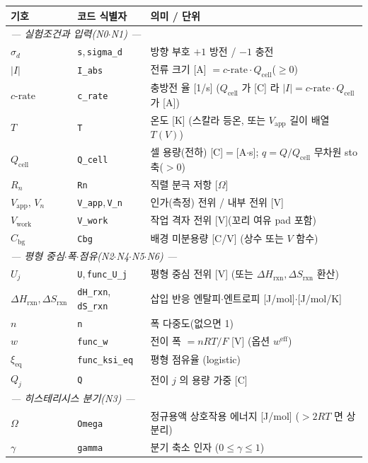 \documentclass[11pt,a4paper]{article}
\newcommand{\eff}{\mathrm{eff}}
\newcommand{\eq}{\mathrm{eq}}
\newcommand{\app}{\mathrm{app}}
\newcommand{\cell}{\mathrm{cell}}
\newcommand{\bg}{\mathrm{bg}}
\newcommand{\work}{\mathrm{work}}
\newcommand{\sgn}{\sigma_d}
\begin{document}
\begin{longtable}{p{} p{} p{}}
\toprule 기호 & 코드 식별자 & 의미 / 단위 \\ \midrule \endhead
\multicolumn{3}{l}{\emph{— 실험조건과 입력(N0$\cdot$N1) —}}\\
$\sgn$ & \texttt{s},\,\texttt{sigma\_d} & 방향 부호 $+1$ 방전 / $-1$ 충전 \\
$|I|$ & \texttt{I\_abs} & 전류 크기 [A] $=c\text{-rate}\cdot Q_\cell$($\ge0$) \\
$c\text{-rate}$ & \texttt{c\_rate} & 충방전 율 [1/s] ($Q_\cell$ 가 [C] 라 $|I|=c\text{-rate}\cdot Q_\cell$ 가 [A]) \\
$T$ & \texttt{T} & 온도 [K] (스칼라 등온, 또는 $V_\app$ 길이 배열 $T(V)$) \\
$Q_\cell$ & \texttt{Q\_cell} & 셀 용량(전하) [C]$=$[A$\cdot$s]; $q=Q/Q_\cell$ 무차원 sto 축($>0$) \\
$R_n$ & \texttt{Rn} & 직렬 분극 저항 [$\Omega$] \\
$V_\app,\,V_n$ & \texttt{V\_app},\,\texttt{V\_n} & 인가(측정) 전위 / 내부 전위 [V] \\
$V_\work$ & \texttt{V\_work} & 작업 격자 전위 [V](꼬리 여유 pad 포함) \\
$C_\bg$ & \texttt{Cbg} & 배경 미분용량 [C/V] (상수 또는 $V$ 함수) \\
\multicolumn{3}{l}{\emph{— 평형 중심$\cdot$폭$\cdot$점유(N2$\cdot$N4$\cdot$N5$\cdot$N6) —}}\\
$U_j$ & \texttt{U},\,\texttt{func\_U\_j} & 평형 중심 전위 [V] (또는 $\Delta H_{\mathrm{rxn}},\Delta S_{\mathrm{rxn}}$ 환산) \\
$\Delta H_{\mathrm{rxn}},\Delta S_{\mathrm{rxn}}$ & \texttt{dH\_rxn},\,\texttt{dS\_rxn} & 삽입 반응 엔탈피$\cdot$엔트로피 [J/mol]$\cdot$[J/mol/K] \\
$n$ & \texttt{n} & 폭 다중도(없으면 1) \\
$w$ & \texttt{func\_w} & 전이 폭 $=nRT/F$ [V] (옵션 $w^\eff$) \\
$\xi_\eq$ & \texttt{func\_ksi\_eq} & 평형 점유율 (logistic) \\
$Q_j$ & \texttt{Q} & 전이 $j$ 의 용량 가중 [C] \\
\multicolumn{3}{l}{\emph{— 히스테리시스 분기(N3) —}}\\
$\Omega$ & \texttt{Omega} & 정규용액 상호작용 에너지 [J/mol] ($>2RT$ 면 상분리) \\
$\gamma$ & \texttt{gamma} & 분기 축소 인자 ($0\le\gamma\le1$) \\

\end{longtable}
\end{document}
